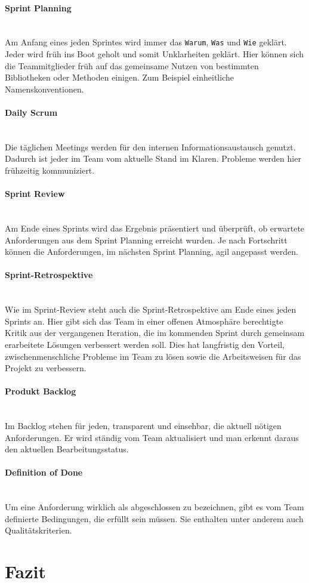 \documentclass[a4paper, ngerman, 12pt, usenames, dvipsnames]{article}
\begin{document}
    \paragraph{Sprint Planning}\mbox{} \\
    Am Anfang eines jeden Sprintes wird immer das \texttt{Warum}, \texttt{Was} und \texttt{Wie} geklärt. 
    Jeder wird früh ins Boot geholt und somit Unklarheiten geklärt.
    Hier können sich die Teammitglieder früh auf das gemeinsame Nutzen von bestimmten Bibliotheken oder Methoden einigen. Zum Beispiel einheitliche Namenskonventionen.
    \paragraph{Daily Scrum}\mbox{} \\
    Die täglichen Meetings werden für den internen Informationsaustausch genutzt.
    Dadurch ist jeder im Team vom aktuelle Stand im Klaren. 
    Probleme werden hier frühzeitig kommuniziert.
    \paragraph{Sprint Review}\mbox{} \\
    Am Ende eines Sprints wird das Ergebnis präsentiert und überprüft, ob erwartete Anforderungen aus dem Sprint Planning erreicht wurden.
    Je nach Fortschritt können die Anforderungen, im nächsten Sprint Planning, agil angepasst werden.
    \paragraph{Sprint-Retrospektive}\mbox{} \\
    Wie im Sprint-Review steht auch die Sprint-Retrospektive am Ende eines jeden Sprints an. Hier gibt sich das Team in einer offenen Atmosphäre berechtigte Kritik aus der vergangenen Iteration, die im kommenden Sprint durch gemeinsam erarbeitete Lösungen verbessert werden soll.
    Dies hat langfristig den Vorteil, zwischenmenschliche Probleme im Team zu lösen sowie die Arbeitsweisen für das Projekt zu verbessern.
    \paragraph{Produkt Backlog}\mbox{} \\
    Im Backlog stehen für jeden, transparent und einsehbar, die aktuell nötigen Anforderungen. 
    Er wird ständig vom Team aktualisiert und man erkennt daraus den aktuellen Bearbeitungsstatus.
    \paragraph{Definition of Done}\mbox{} \\
    Um eine Anforderung wirklich als abgeschlossen zu bezeichnen, gibt es vom Team definierte Bedingungen, die erfüllt sein müssen.
    Sie enthalten unter anderem auch Qualitätskriterien.

\section{Fazit}



\end{document}
